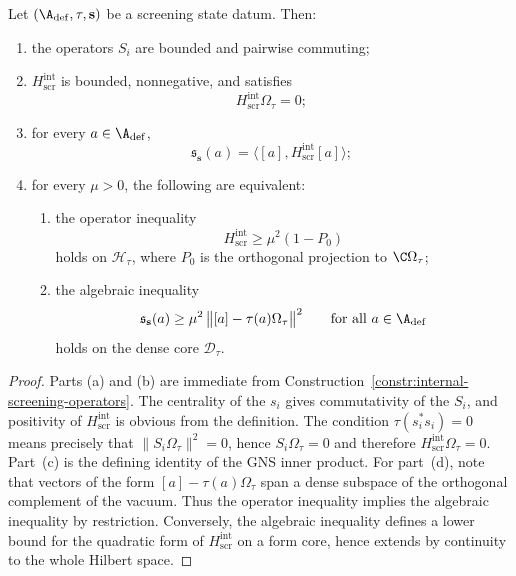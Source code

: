 \begin{proposition}
\label{prop:internal-screening-form}
Let $(\A_{\mathrm{def}},\tau,\mathbf s)$ be a screening state datum.
Then:
\begin{enumerate}[label=(\alph*)]
\item the operators $S_i$ are bounded and pairwise commuting;
\item $H_{\mathrm{scr}}^{\mathrm{int}}$ is bounded, nonnegative, and satisfies
\[
H_{\mathrm{scr}}^{\mathrm{int}}\Omega_\tau=0;
\]
\item for every $a\in \A_{\mathrm{def}}$,
\[
\mathfrak s_{\mathbf s}(a)=\bigl\langle [a],H_{\mathrm{scr}}^{\mathrm{int}}[a]\bigr\rangle;
\]
\item for every $\mu>0$, the following are equivalent:
\begin{enumerate}[label=(\arabic*)]
\item the operator inequality
\[
H_{\mathrm{scr}}^{\mathrm{int}}\ge \mu^2(1-P_0)
\]
holds on $\mathcal H_\tau$, where $P_0$ is the orthogonal projection to $\C\Omega_\tau$;
\item the algebraic inequality
\[
\mathfrak s_{\mathbf s}(a)\ge \mu^2\,\bigl\|[a]-\tau(a)\Omega_\tau\bigr\|^2
\qquad\text{for all }a\in \A_{\mathrm{def}}
\]
holds on the dense core $\mathcal D_\tau$.
\end{enumerate}
\end{enumerate}
\end{proposition}

\begin{proof}
Parts (a) and (b) are immediate from Construction~\ref{constr:internal-screening-operators}.
The centrality of the $s_i$ gives commutativity of the $S_i$, and positivity of $H_{\mathrm{scr}}^{\mathrm{int}}$
is obvious from the definition.  The condition $\tau(s_i^*s_i)=0$ means precisely that
$\|S_i\Omega_\tau\|^2=0$, hence $S_i\Omega_\tau=0$ and therefore
$H_{\mathrm{scr}}^{\mathrm{int}}\Omega_\tau=0$.
Part~(c) is the defining identity of the GNS inner product.
For part~(d), note that vectors of the form
$[a]-\tau(a)\Omega_\tau$ span a dense subspace of the orthogonal complement of the vacuum.
Thus the operator inequality implies the algebraic inequality by restriction.
Conversely, the algebraic inequality defines a lower bound for the quadratic form of
$H_{\mathrm{scr}}^{\mathrm{int}}$ on a form core, hence extends by continuity to the whole Hilbert space.
\end{proof}

